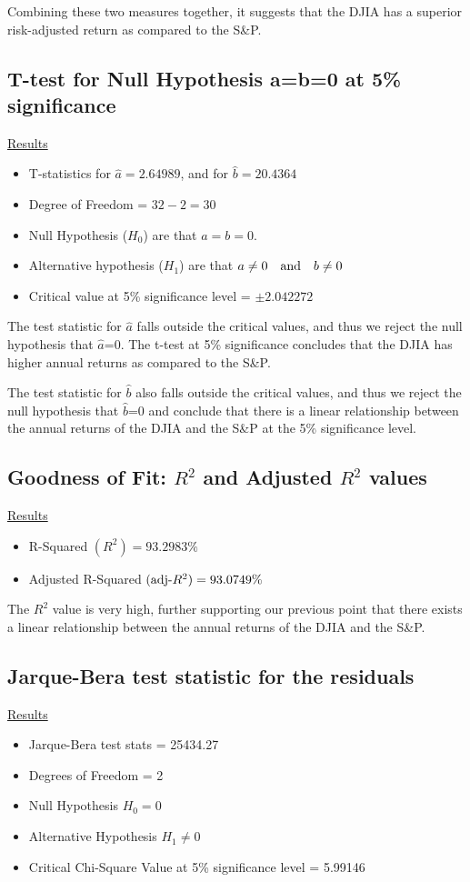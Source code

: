 \documentclass[a4paper]{article}
\begin{document}
	Combining these two measures together, it suggests that the DJIA has a superior risk-adjusted return as compared to the S\&P. 
	
	
	\subsection{T-test for Null Hypothesis a=b=0 at 5\% significance}
	\underline{Results}
	\begin{itemize}[nosep]
		\item T-statistics for $\hat{a} = 2.64989$, and for $\hat{b} = 20.4364$
		\item Degree of Freedom = $32 - 2 = 30$
		\item Null Hypothesis ($H_0$) are that $a=b=0$.
		\item Alternative hypothesis ($H_1$) are that $a\ne 0 \quad \textnormal{and} \quad b\ne 0$
		\item Critical value at 5\% significance level = $\pm2.042272$
	\end{itemize}

    The test statistic for $\hat{a}$ falls outside the critical values, and thus we reject the null hypothesis that $\hat{a}$=0. The t-test at 5\% significance concludes that the DJIA has higher annual returns as compared to the S\&P.  
    
    The test statistic for $\hat{b}$ also falls outside the critical values, and thus we reject the null hypothesis that $\hat{b}$=0 and conclude that there is a linear relationship between the annual returns of the DJIA and the S\&P at the 5\% significance level.

	\subsection{Goodness of Fit: $R^2$ and Adjusted $R^2$ values}
	\underline{Results}
	\begin{itemize}[nosep]
		\item R-Squared $(R^2) = 93.2983\%$
		\item Adjusted R-Squared $(\textnormal{adj-}R^2) = 93.0749\%$
	\end{itemize}

     The $R^2$ value is very high, further supporting our previous point that there exists a linear relationship between the annual returns of the DJIA and the S\&P.
	
	\subsection{Jarque-Bera test statistic for the residuals}
	\underline{Results}
	\begin{itemize}[nosep]
		\item Jarque-Bera test stats = 25434.27
		\item Degrees of Freedom = 2
		\item Null Hypothesis $H_0 = 0$
		\item Alternative Hypothesis $H_1 \ne 0$
		\item Critical Chi-Square Value at 5\% significance level = 5.99146
	\end{itemize}
	
\end{document}
